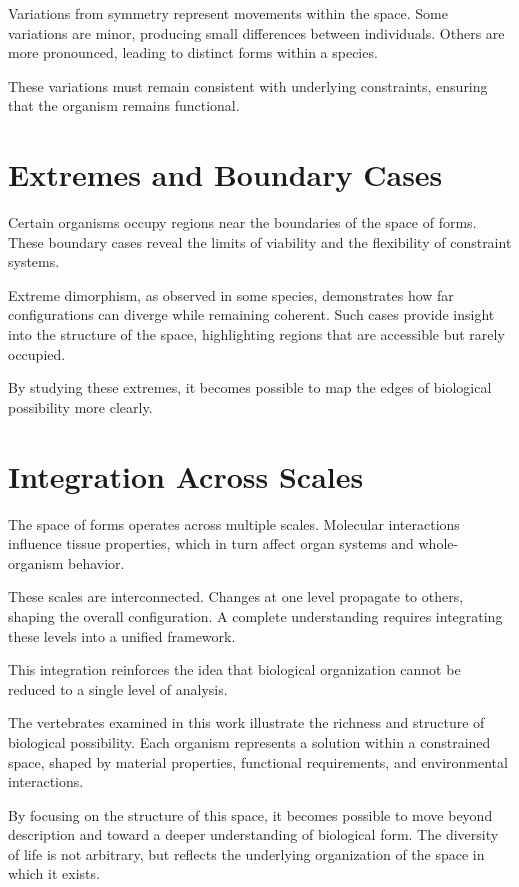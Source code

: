 \documentclass[11pt,oneside]{book}
\begin{document}
Variations from symmetry represent movements within the space. Some variations are minor, producing small differences between individuals. Others are more pronounced, leading to distinct forms within a species.

These variations must remain consistent with underlying constraints, ensuring that the organism remains functional.

\section{Extremes and Boundary Cases}

Certain organisms occupy regions near the boundaries of the space of forms. These boundary cases reveal the limits of viability and the flexibility of constraint systems.

Extreme dimorphism, as observed in some species, demonstrates how far configurations can diverge while remaining coherent. Such cases provide insight into the structure of the space, highlighting regions that are accessible but rarely occupied.

By studying these extremes, it becomes possible to map the edges of biological possibility more clearly.

\section{Integration Across Scales}

The space of forms operates across multiple scales. Molecular interactions influence tissue properties, which in turn affect organ systems and whole-organism behavior.

These scales are interconnected. Changes at one level propagate to others, shaping the overall configuration. A complete understanding requires integrating these levels into a unified framework.

This integration reinforces the idea that biological organization cannot be reduced to a single level of analysis.

The vertebrates examined in this work illustrate the richness and structure of biological possibility. Each organism represents a solution within a constrained space, shaped by material properties, functional requirements, and environmental interactions.

By focusing on the structure of this space, it becomes possible to move beyond description and toward a deeper understanding of biological form. The diversity of life is not arbitrary, but reflects the underlying organization of the space in which it exists.
\end{document}
